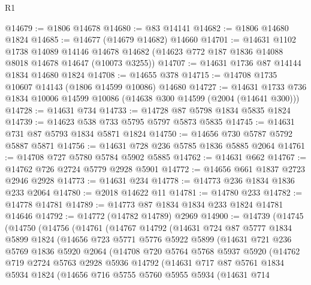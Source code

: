 \begin{lexlean}{R1}
\begin{coremodule}
@14679 := @1806 @14678
@14680 := @83 @14141
@14682 := @1806 @14680 @1824
@14685 := @14677 (@14679 @14682) @14660
@14701 := @14631
    @1102
    @1738
    @14089
    @14146
    @14678
    @14682
    (@14623 @772 @187 @1836 @14088 @8018 @14678 @14647 (@10073 @3255))
@14707 := @14631 @1736 @87 @14144 @1834 @14680 @1824
@14708 := @14655 @378
@14715 := @14708 @1735 @10607 @14143 (@1806 @14599 @10086) @14680
@14727 := @14631 @1733 @736 @1834 @10006 @14599 @10086 (@14638 @300 @14599 (@2004 (@14641 @300)))
@14728 := @14631 @734
@14733 := @14728 @87 @5798 @1834 @5835 @1824
@14739 := @14623 @538 @733 @5795 @5797 @5873 @5835
@14745 := @14631 @731 @87 @5793 @1834 @5871 @1824
@14750 := @14656 @730 @5787 @5792 @5887 @5871
@14756 := @14631 @728 @236 @5785 @1836 @5885 @2064
@14761 := @14708 @727 @5780 @5784 @5902 @5885
@14762 := @14631 @662
@14767 := @14762 @726 @2724 @5779 @2928 @5901
@14772 := @14656 @661 @1837 @2723 @2946 @2928
@14773 := @14631 @234
@14778 := @14773 @236 @1834 @1836 @233 @2064
@14780 := @2018 @14622 @11
@14781 := @14780 @233
@14782 := @14778 @14781
@14789 := @14773 @87 @1834 @1834 @233 @1824 @14781 @14646
@14792 := @14772 (@14782 @14789) @2969
@14900 := @14739
    (@14745
      (@14750
        (@14756
          (@14761
            (@14767
              @14792
              (@14631
                @724
                @87
                @5777
                @1834
                @5899
                @1824
                (@14656
                  @723
                  @5771
                  @5776
                  @5922
                  @5899
                  (@14631
                    @721
                    @236
                    @5769
                    @1836
                    @5920
                    @2064
                    (@14708
                      @720
                      @5764
                      @5768
                      @5937
                      @5920
                      (@14762
                        @719
                        @2724
                        @5763
                        @2928
                        @5936
                        @14792
                        (@14631
                          @717
                          @87
                          @5761
                          @1834
                          @5934
                          @1824
                          (@14656
                            @716
                            @5755
                            @5760
                            @5955
                            @5934
                            (@14631
                              @714

\end{coremodule}
\end{lexlean}
